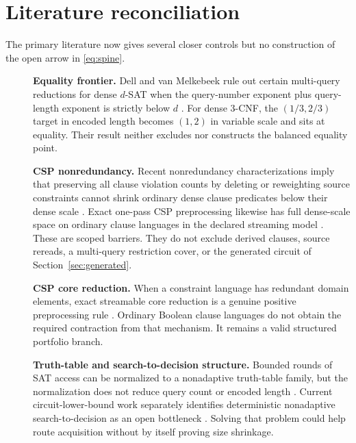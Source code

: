 \documentclass[11pt]{article}
\begin{document}
\section{Literature reconciliation}

The primary literature now gives several closer controls but no construction
of the open arrow in \eqref{eq:spine}.

\begin{description}
\item[] \textbf{Equality frontier.}
Dell and van Melkebeek rule out certain multi-query reductions for dense
$d$-SAT when the query-number exponent plus query-length exponent is strictly
below $d$ \cite{dellvanmelkebeek2014}.  For dense 3-CNF, the
$(1/3,2/3)$ target in encoded length becomes $(1,2)$ in variable scale and
sits at equality.  Their result neither excludes nor constructs the balanced
equality point.

\item[] \textbf{CSP nonredundancy.}
Recent nonredundancy characterizations imply that preserving all clause
violation counts by deleting or reweighting source constraints cannot shrink
ordinary dense clause predicates below their dense scale
\cite{brakensiekguruswami2026}.  Exact one-pass CSP preprocessing likewise
has full dense-scale space on ordinary clause languages in the declared
streaming model \cite{sharmavelusamy2026}.  These are scoped barriers.  They
do not exclude derived clauses, source rereads, a multi-query restriction
cover, or the generated circuit of Section~\ref{sec:generated}.

\item[] \textbf{CSP core reduction.}
When a constraint language has redundant domain elements, exact streamable
core reduction is a genuine positive preprocessing rule
\cite{brakensiekputterman2026}.  Ordinary Boolean clause languages do not
obtain the required contraction from that mechanism.  It remains a valid
structured portfolio branch.

\item[] \textbf{Truth-table and search-to-decision structure.}
Bounded rounds of SAT access can be normalized to a nonadaptive truth-table
family, but the normalization does not reduce query count or encoded length
\cite{busshay1991}.  Current circuit-lower-bound work separately identifies
deterministic nonadaptive search-to-decision as an open bottleneck
\cite{renwilliams2026}.  Solving that problem could help route acquisition
without by itself proving size shrinkage.


\end{description}
\end{document}
